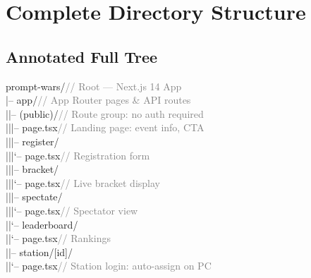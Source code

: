 \documentclass[11pt, a4paper]{article}
\begin{document}
\section{Complete Directory Structure}

\subsection{Annotated Full Tree}

\begin{tcolorbox}[codebox]
\small\color{white}\ttfamily
prompt-wars/\textcolor{gray}{\quad\quad\quad\quad\quad\quad\quad\quad\quad\quad\quad\quad// Root --- Next.js 14 App}\\
\textcolor{codeblue}{|--} app/\textcolor{gray}{\quad\quad\quad\quad\quad\quad\quad\quad\quad\quad\quad\quad\quad\quad// App Router pages \& API routes}\\
\textcolor{codeblue}{|\quad |--} (public)/\textcolor{gray}{\quad\quad\quad\quad\quad\quad\quad\quad\quad\quad// Route group: no auth required}\\
\textcolor{codeblue}{|\quad |\quad |--} page.tsx\textcolor{gray}{\quad\quad\quad\quad\quad\quad\quad\quad// Landing page: event info, CTA}\\
\textcolor{codeblue}{|\quad |\quad |--} register/\\
\textcolor{codeblue}{|\quad |\quad |\quad `--} page.tsx\textcolor{gray}{\quad\quad\quad\quad\quad// Registration form}\\
\textcolor{codeblue}{|\quad |\quad |--} bracket/\\
\textcolor{codeblue}{|\quad |\quad |\quad `--} page.tsx\textcolor{gray}{\quad\quad\quad\quad\quad// Live bracket display}\\
\textcolor{codeblue}{|\quad |\quad |--} spectate/\\
\textcolor{codeblue}{|\quad |\quad |\quad `--} page.tsx\textcolor{gray}{\quad\quad\quad\quad\quad// Spectator view}\\
\textcolor{codeblue}{|\quad |\quad `--} leaderboard/\\
\textcolor{codeblue}{|\quad |\quad\quad\quad `--} page.tsx\textcolor{gray}{\quad\quad\quad\quad// Rankings}\\
\textcolor{codeblue}{|\quad |--} station/[id]/\\
\textcolor{codeblue}{|\quad |\quad `--} page.tsx\textcolor{gray}{\quad\quad\quad\quad\quad\quad\quad\quad// Station login: auto-assign on PC}\\

\end{tcolorbox}
\end{document}

